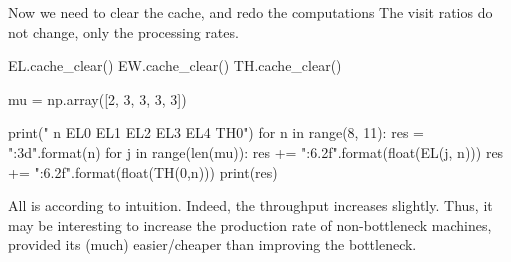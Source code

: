 \begin{exercise}
\begin{solution}
\begin{pyconsole}
\end{pyconsole}

Now we need to clear the cache, and redo the computations
The visit ratios do not change, only the processing rates.

\begin{pyconsole}
EL.cache_clear()
EW.cache_clear()
TH.cache_clear()

mu = np.array([2, 3, 3, 3, 3])

print(" n  EL0  EL1  EL2   EL3   EL4 TH0")
for n in range(8, 11):
    res = "{:3d}".format(n)
    for j in range(len(mu)):
        res += "{:6.2f}".format(float(EL(j, n)))
    res += "{:6.2f}".format(float(TH(0,n)))
    print(res)
  
\end{pyconsole}

All is according to intuition. Indeed, the throughput increases
slightly. Thus, it may be interesting to increase the production rate
of non-bottleneck machines, provided its (much) easier/cheaper than
improving the bottleneck.
\end{solution}
\end{exercise}

